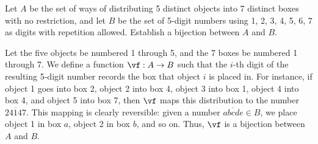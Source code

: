 \begin{problem}
    Let $A$ be the set of ways of distributing 5 distinct objects into 7 distinct boxes with no restriction, and let $B$ be the set of 5-digit numbers using 1, 2, 3, 4, 5, 6, 7 as digits with repetition allowed. Establish a bijection between $A$ and $B$.
\end{problem}
\begin{solution}
    Let the five objects be numbered 1 through 5, and the 7 boxes be numbered 1 through 7. We define a function $\vf : A \to B$ such that the $i$-th digit of the resulting 5-digit number records the box that object $i$ is placed in. For instance, if object 1 goes into box 2, object 2 into box 4, object 3 into box 1, object 4 into box 4, and object 5 into box 7, then $\vf$ maps this distribution to the number $\overline{24147}$. This mapping is clearly reversible: given a number $\overline{abcde} \in B$, we place object 1 in box $a$, object 2 in box $b$, and so on. Thus, $\vf$ is a bijection between $A$ and $B$.
\end{solution}

